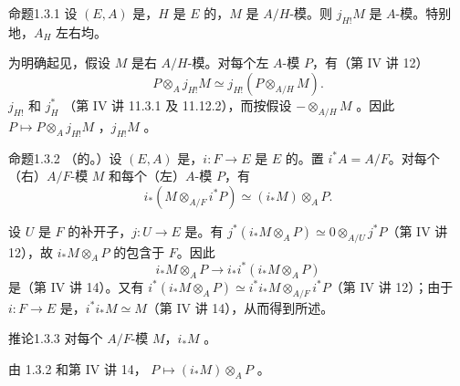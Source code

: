 \begin{SGAresult}{命题}{1.3.1}
设 $(E,A)$ 是，$H$ 是 $E$ 的，$M$ 是 $A/H$-模。则 $j_{H!}M$ 是 $A$-模。特别地，$A_H$ 左右均。
\end{SGAresult}
为明确起见，假设 $M$ 是右 $A/H$-模。对每个左 $A$-模 $P$，有（第 IV 讲 12）
\[
 P\otimes_Aj_{H!}M\simeq j_{H!}(P\otimes_{A/H}M).
\]
 $j_{H!}$ 和 $j_H^*$ （第 IV 讲 11.3.1 及 11.12.2），而按假设 $-\otimes_{A/H}M$ 。因此 $P\mapsto P\otimes_Aj_{H!}M$ ，$j_{H!}M$ 。
\begin{SGAresult}{命题}{1.3.2}
（的。）设 $(E,A)$ 是，$i:F\to E$ 是 $E$ 的。置 $i^*A=A/F$。对每个（右）$A/F$-模 $M$ 和每个（左）$A$-模 $P$，有
\[
 i_*(M\otimes_{A/F}i^*P)\simeq(i_*M)\otimes_AP.
\]
\end{SGAresult}
设 $U$ 是 $F$ 的补开子，$j:U\to E$ 是。有
$j^*(i_*M\otimes_AP)\simeq0\otimes_{A/U}j^*P$（第 IV 讲 12），故 $i_*M\otimes_AP$ 的包含于 $F$。因此
\[
 i_*M\otimes_AP\longrightarrow i_*i^*(i_*M\otimes_AP)
\]
是（第 IV 讲 14）。又有 $i^*(i_*M\otimes_AP)\simeq i^*i_*M\otimes_{A/F}i^*P$（第 IV 讲 12）；由于 $i:F\to E$ 是，$i^*i_*M\simeq M$（第 IV 讲 14），从而得到所述。
\begin{SGAresult}{推论}{1.3.3}
对每个 $A/F$-模 $M$，$i_*M$ 。
\end{SGAresult}
由 1.3.2 和第 IV 讲 14， $P\mapsto(i_*M)\otimes_AP$ 。

